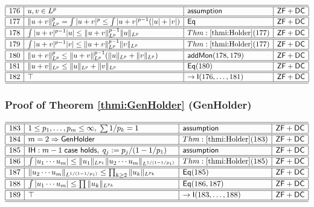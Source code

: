 \documentclass[11pt,reqno]{amsart}
\begin{document}
\noindent$%
\begin{array}{|r|l|l|l|}
\hline\hline
176 & u,v\in L^{p} & \mathsf{assumption} & \mathsf{ZF+DC} \\ \hline\hline
177 & \|u+v\|_{L^{p}}^{p}=\int|u+v|^{p}\le\int|u+v|^{p-1}(|u|+|v|) & \mathsf{Eq} & \mathsf{ZF+DC} \\ \hline\hline
178 & \int|u+v|^{p-1}|u|\le\|u+v\|_{L^{p}}^{p-1}\|u\|_{L^{p}} & Thm:\ref{thmi:Holder}(177) & \mathsf{ZF+DC} \\ \hline\hline
179 & \int|u+v|^{p-1}|v|\le\|u+v\|_{L^{p}}^{p-1}\|v\|_{L^{p}} & Thm:\ref{thmi:Holder}(177) & \mathsf{ZF+DC} \\ \hline\hline
180 & \|u+v\|_{L^{p}}^{p}\le\|u+v\|_{L^{p}}^{p-1}(\|u\|_{L^{p}}+\|v\|_{L^{p}}) & \mathsf{addMon}(178,179) & \mathsf{ZF+DC} \\ \hline\hline
181 & \|u+v\|_{L^{p}}\le\|u\|_{L^{p}}+\|v\|_{L^{p}} & \mathsf{Eq}(180) & \mathsf{ZF+DC} \\ \hline\hline
182 & \top & \to\mathsf{I}(176,\dots,181) & \mathsf{ZF+DC} \\ \hline\hline
\end{array}%
$

\medskip

\subsubsection*{Proof of Theorem \ref{thmi:GenHolder} (\textsf{GenHolder})}

\noindent$%
\begin{array}{|r|l|l|l|}
\hline\hline
183 & 1\le p_{1},\dots,p_{m}\le\infty,\;\sum 1/p_{k}=1 & \mathsf{assumption} & \mathsf{ZF+DC} \\ \hline\hline
184 & m=2\Rightarrow\mathsf{GenHolder} & Thm:\ref{thmi:Holder}(183) & \mathsf{ZF+DC} \\ \hline\hline
185 & \mathsf{IH}:m-1\;\mathsf{case\ holds},\;q_{j}:=p_{j}/(1-1/p_{1}) & \mathsf{assumption} & \mathsf{ZF+DC} \\ \hline\hline
186 & \int|u_{1}\cdots u_{m}|\le\|u_{1}\|_{L^{p_{1}}}\|u_{2}\cdots u_{m}\|_{L^{1/(1-1/p_{1})}} & Thm:\ref{thmi:Holder}(185) & \mathsf{ZF+DC} \\ \hline\hline
187 & \|u_{2}\cdots u_{m}\|_{L^{1/(1-1/p_{1})}}\le\prod_{k\ge2}\|u_{k}\|_{L^{p_{k}}} & \mathsf{Eq}(185) & \mathsf{ZF+DC} \\ \hline\hline
188 & \int|u_{1}\cdots u_{m}|\le\prod\|u_{k}\|_{L^{p_{k}}} & \mathsf{Eq}(186,187) & \mathsf{ZF+DC} \\ \hline\hline
189 & \top & \to\mathsf{I}(183,\dots,188) & \mathsf{ZF+DC} \\ \hline\hline
\end{array}%
$
\end{document}
